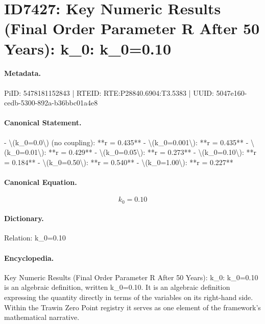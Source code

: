 \section*{ID7427: Key Numeric Results (Final Order Parameter R After 50 Years): k\_0: k\_0=0.10}
\paragraph{Metadata.}
PiID: 5478181152843 | RTEID: RTE:P28840.6904:T3.5383 | UUID: 5047e160-cedb-5300-892a-b36bbc01a4e8

\paragraph{Canonical Statement.}
- \textbackslash{}(k\_0=0.0\textbackslash{}) (no coupling): **r = 0.435** - \textbackslash{}(k\_0=0.001\textbackslash{}): **r = 0.435** - \textbackslash{}(k\_0=0.01\textbackslash{}): **r = 0.429** - \textbackslash{}(k\_0=0.05\textbackslash{}): **r = 0.273** - \textbackslash{}(k\_0=0.10\textbackslash{}): **r = 0.184** - \textbackslash{}(k\_0=0.50\textbackslash{}): **r = 0.540** - \textbackslash{}(k\_0=1.00\textbackslash{}): **r = 0.227**

\paragraph{Canonical Equation.}
\[
k_0=0.10
\]

\paragraph{Dictionary.}
Relation: k\_0=0.10

\paragraph{Encyclopedia.}
Key Numeric Results (Final Order Parameter R After 50 Years): k\_0: k\_0=0.10 is an algebraic definition, written k\_0=0.10. It is an algebraic definition expressing the quantity directly in terms of the variables on its right-hand side. Within the Trawin Zero Point registry it serves as one element of the framework's mathematical narrative.
